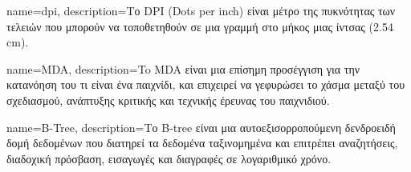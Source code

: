 {
	name={dpi},
	description={Το DPI (Dots per inch) είναι μέτρο της πυκνότητας των τελειών που μπορούν να τοποθετηθούν σε μια γραμμή στο μήκος μιας ίντσας (2.54 cm).}
}

{
	name={MDA},
	description={To MDA είναι μια επίσημη προσέγγιση για την κατανόηση του τι είναι ένα παιχνίδι, και επιχειρεί να γεφυρώσει το χάσμα μεταξύ του σχεδιασμού, ανάπτυξης κριτικής και τεχνικής έρευνας του παιχνιδιού. }	
}

{	
	name={B-Tree},
	description={Το B-tree είναι μια αυτοεξισορροπούμενη δενδροειδή δομή δεδομένων που διατηρεί τα δεδομένα ταξινομημένα και επιτρέπει αναζητήσεις, διαδοχική πρόσβαση, εισαγωγές και διαγραφές σε λογαριθμικό χρόνο. }
}